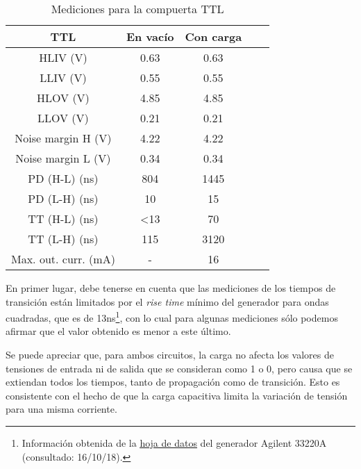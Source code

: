 \documentclass[../../e3_tp2_main.tex]{subfiles}
\begin{document}
\begin{table}[H]
	\centering
	\begin{tabular}{|c|c|c|c|c|}
	\hline
        \textbf{TTL}          	& En vac\'io	& Con carga \\ \hline \hline
	HLIV (V)                   	& 0.63             	& 0.63                       \\ \hline
	LLIV (V)                    	& 0.55             	& 0.55                      \\ \hline
	HLOV (V)                  	& 4.85             	& 4.85                \\ \hline
	LLOV (V)                   	& 0.21             	& 0.21                        \\ \hline
	Noise margin H (V)    	& 4.22              	& 4.22                                \\ \hline
	Noise margin L (V)	& 0.34		& 0.34				\\ \hline
	PD (H-L) (ns)		& 804               	& 1445                  \\ \hline
	PD (L-H) (ns) 		& 10               	& 15                   \\ \hline
	TT (H-L) (ns)   		& <13               & 70              \\ \hline
	TT (L-H) (ns)   		& 115               	& 3120                    \\ \hline
	Max. out. curr. (mA)   & -                  	& 16               \\ \hline

	\end{tabular}
	
	\caption{Mediciones para la compuerta TTL}
	\label{table:1-mediciones-ttl}
\end{table}

En primer lugar, debe tenerse en cuenta que las mediciones de los tiempos de transici\'on est\'an limitados por el \textit{rise time} m\'inimo del generador para ondas cuadradas, que es de 13ns\footnote{Informaci\'on obtenida de la \href{https://literature.cdn.keysight.com/litweb/pdf/5988-8544EN.pdf?id=187648}{\underline{hoja de datos}} del generador Agilent 33220A (consultado: 16/10/18).}, con lo cual para algunas mediciones s\'olo podemos afirmar que el valor obtenido es menor a este \'ultimo. \par

Se puede apreciar que, para ambos circuitos, la carga no afecta los valores de tensiones de entrada ni de salida que se consideran como 1 o 0, pero causa que se extiendan todos los tiempos, tanto de propagaci\'on como de transici\'on. Esto es consistente con el hecho de que la carga capacitiva limita la variaci\'on de tensi\'on para una misma corriente.\par
\end{document}
